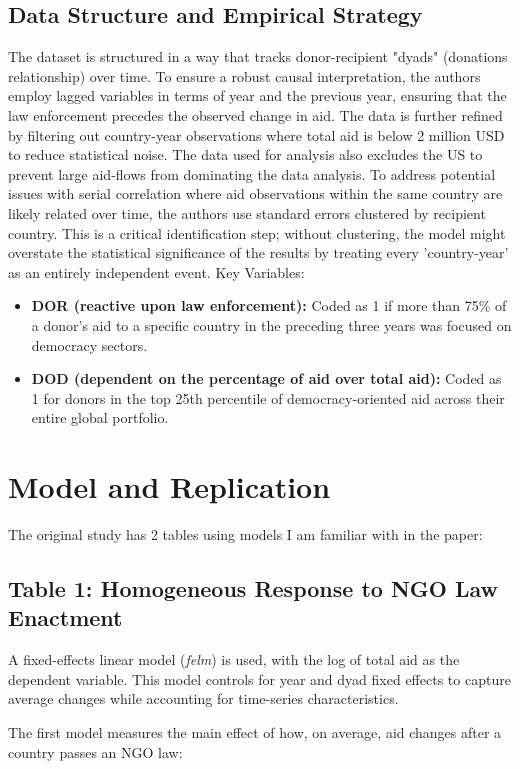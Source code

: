\documentclass[12pt, a4paper]{article}
\begin{document}
\subsection{Data Structure and Empirical Strategy}
The dataset is structured in a way that tracks donor-recipient "dyads" (donations relationship) over time. To ensure a robust causal interpretation, the authors employ lagged variables in terms of year and the previous year, ensuring that the law enforcement precedes the observed change in aid. The data is further refined by filtering out country-year observations where total aid is below 2 million USD to reduce statistical noise. The data used for analysis also excludes the US to prevent large aid-flows from dominating the data analysis.
To address potential issues with serial correlation where aid observations within the same country are likely related over time, the authors use standard errors clustered by recipient country. This is a critical identification step; without clustering, the model might overstate the statistical significance of the results by treating every 'country-year' as an entirely independent event.
Key Variables:
\begin{itemize}
    \item \textbf{DOR (reactive upon law enforcement):} Coded as 1 if more than 75\% of a donor's aid to a specific country in the preceding three years was focused on democracy sectors.
    \item \textbf{DOD (dependent on the percentage of aid over total aid):} Coded as 1 for donors in the top 25th percentile of democracy-oriented aid across their entire global portfolio.
\end{itemize}


\section{Model and Replication}
The original study has 2 tables using models I am familiar with in the paper:

\subsection{Table 1: Homogeneous Response to NGO Law Enactment}
A fixed-effects linear model (\textit{felm}) is used, with the log of total aid as the dependent variable. This model controls for year and dyad fixed effects to capture average changes while accounting for time-series characteristics. 
 
The first model measures the main effect of how, on average, aid changes after a country passes an NGO law:
\end{document}
